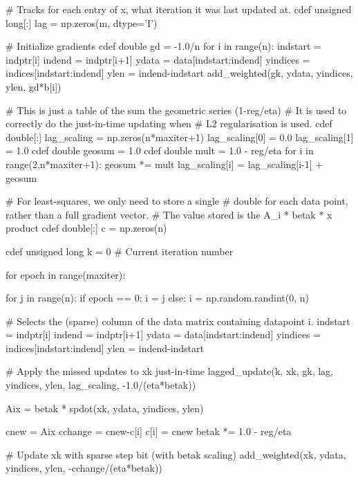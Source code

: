 \documentclass{article}
\begin{document}
\begin{python}
    # Tracks for each entry of x, what iteration it was last updated at.
    cdef unsigned long[:] lag = np.zeros(m, dtype='I')
    
    # Initialize gradients
    cdef double gd = -1.0/n
    for i in range(n):
        indstart = indptr[i]
        indend = indptr[i+1]
        ydata = data[indstart:indend]
        yindices = indices[indstart:indend]
        ylen = indend-indstart
        add_weighted(gk, ydata, yindices, ylen, gd*b[i])

    # This is just a table of the sum the geometric series (1-reg/eta)
    # It is used to correctly do the just-in-time updating when
    # L2 regularisation is used.
    cdef double[:] lag_scaling = np.zeros(n*maxiter+1)
    lag_scaling[0] = 0.0
    lag_scaling[1] = 1.0
    cdef double geosum = 1.0
    cdef double mult = 1.0 - reg/eta
    for i in range(2,n*maxiter+1):
        geosum *= mult
        lag_scaling[i] = lag_scaling[i-1] + geosum
    
    # For least-squares, we only need to store a single
    # double for each data point, rather than a full gradient vector.
    # The value stored is the A_i * betak * x product
    cdef double[:] c = np.zeros(n)
    
    cdef unsigned long k = 0 # Current iteration number
    
    for epoch in range(maxiter):
            
        for j in range(n):
            if epoch == 0:
                i = j 
            else:
                i = np.random.randint(0, n)
            
            # Selects the (sparse) column of the data matrix containing datapoint i.
            indstart = indptr[i]
            indend = indptr[i+1]
            ydata = data[indstart:indend]
            yindices = indices[indstart:indend]
            ylen = indend-indstart
            
            # Apply the missed updates to xk just-in-time
            lagged_update(k, xk, gk, lag, yindices, ylen, lag_scaling, -1.0/(eta*betak))
            
            Aix = betak * spdot(xk, ydata, yindices, ylen)
            
            cnew = Aix
            cchange = cnew-c[i]
            c[i] = cnew
            betak *= 1.0 - reg/eta
            
            # Update xk with sparse step bit (with betak scaling)
            add_weighted(xk, ydata, yindices, ylen, -cchange/(eta*betak))
            

\end{python}
\end{document}
